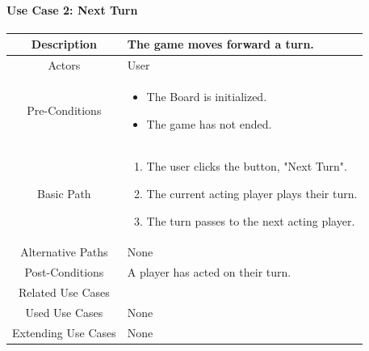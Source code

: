 \documentclass[10pt, a4paper]{article}
\begin{document}
			\newpage
			
			\paragraph{Use Case 2: Next Turn}
			
			\begin{center}
				\begin{tabular}{ |c|p{10cm}| } 
					\hline
					Description & The game moves forward a turn. \\
					\hline 
					Actors & User \\
					\hline  
					Pre-Conditions & \begin{itemize}[noitemsep,topsep=0pt]
						\item The Board is initialized.
						\item The game has not ended.
					\end{itemize} \\
					\hline  
					Basic Path & 
					\begin{enumerate}
						\item The user clicks the button, "Next Turn".
						\item The current acting player plays their turn.
						\item The turn passes to the next acting player.
					\end{enumerate}\\
					\hline
					Alternative Paths & None \\
					\hline
					Post-Conditions & A player has acted on their turn.\\
					\hline 
					Related Use Cases & \\
					\hline 
					Used Use Cases & None\\
					\hline 
					Extending Use Cases & None \\
					\hline 
				\end{tabular}
			\end{center}
		
			
\end{document}

